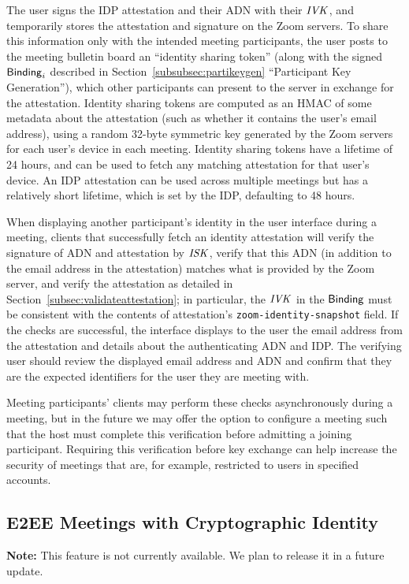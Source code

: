 The user signs the IDP attestation and their ADN with their $\mathit{IVK}$, and
temporarily stores the attestation and signature on the Zoom servers. To share
this information only with the intended meeting participants, the user posts to
the meeting bulletin board an ``identity sharing token'' (along with the signed
${\sf Binding}_i$ described in Section~\ref{subsubsec:partikeygen} ``Participant Key
Generation''), which other participants can present to the server in exchange
for the attestation. Identity sharing tokens are computed as an HMAC of some
metadata about the attestation (such as whether it contains the user's email
address), using a random 32-byte symmetric key generated by the Zoom servers for
each user's device in each meeting. Identity sharing tokens have a lifetime of
24 hours, and can be used to fetch any matching attestation for that user's
device.  An IDP attestation can be used across multiple meetings but has a
relatively short lifetime, which is set by the IDP, defaulting to 48 hours.

When displaying another participant's identity in the user interface during a
meeting, clients that successfully fetch an identity attestation will verify the
signature of ADN and attestation by $\mathit{ISK}$, verify that this ADN (in addition to
the email address in the attestation) matches what is provided by the Zoom
server, and verify the attestation as detailed in
Section~\ref{subsec:validateattestation}; in particular, the $\mathit{IVK}$ in the
${\sf Binding}$ must be consistent with the contents of attestation's
\texttt{zoom-identity-snapshot} field. If the checks are successful, the
interface displays to the user the email address from the attestation and
details about the authenticating ADN and IDP. The verifying user should review
the displayed email address and ADN and confirm that they are the expected
identifiers for the user they are meeting with.

Meeting participants' clients may perform these checks asynchronously during a
meeting, but in the future we may offer the option to configure a meeting such
that the host must complete this verification before admitting
a joining participant. Requiring this verification
before key exchange can help increase the security of meetings that are, 
for example, restricted to users in specified accounts. 

\subsection{E2EE Meetings with Cryptographic Identity}
\label{subsec:keyagreementidentity}
\textbf{Note:} This feature is not currently available. We plan to release it in a future update.

